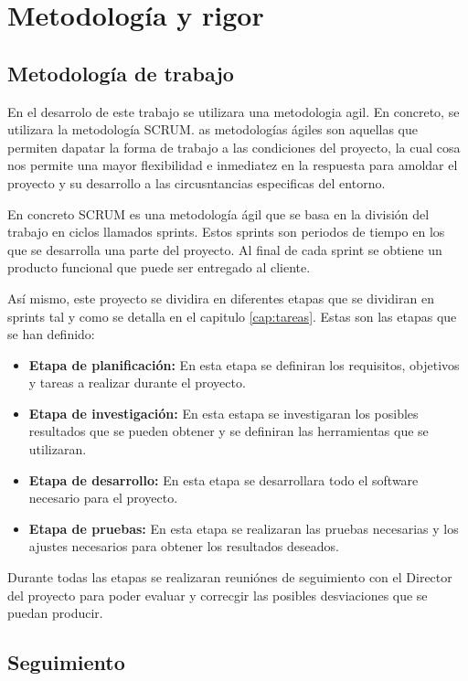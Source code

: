 \chapter{Metodología y rigor}
\label{cap:metodologia}

\section{Metodología de trabajo}
\label{sec:metodologia:metodologia_trabajo}

En el desarrolo de este trabajo se utilizara una metodologia agil. En concreto, se utilizara 
la metodología SCRUM. as metodologías ágiles son aquellas que permiten dapatar la forma de
trabajo a las condiciones del proyecto, la cual cosa nos permite una mayor flexibilidad e 
inmediatez en la respuesta para amoldar el proyecto y su desarrollo a las circusntancias
especificas del entorno.

En concreto SCRUM es una metodología ágil que se basa en la división del trabajo en ciclos
llamados sprints. Estos sprints son periodos de tiempo en los que se desarrolla una parte
del proyecto. Al final de cada sprint se obtiene un producto funcional que puede ser entregado
al cliente. \cite{MetodoAgile}

Así mismo, este proyecto se dividira en diferentes etapas que se dividiran en sprints tal y
como se detalla en el capitulo \ref{cap:tareas}. Estas son las etapas que se han definido:

\begin{itemize}
    \item \textbf{Etapa de planificación:} En esta etapa se definiran los requisitos, 
    objetivos y tareas a realizar durante el proyecto.
    \item \textbf{Etapa de investigación:} En esta estapa se investigaran los posibles 
    resultados que se pueden obtener y se definiran las herramientas que se utilizaran.
    \item \textbf{Etapa de desarrollo:} En esta etapa se desarrollara todo el software 
    necesario para el proyecto.
    \item \textbf{Etapa de pruebas:} En esta etapa se realizaran las pruebas necesarias y los 
    ajustes necesarios para obtener los resultados deseados.
\end{itemize}

Durante todas las etapas se realizaran reuniónes de seguimiento con el Director del proyecto para
poder evaluar y correcgir las posibles desviaciones que se puedan producir.

\section{Seguimiento}
\label{sec:metodologia:seguimiento}

